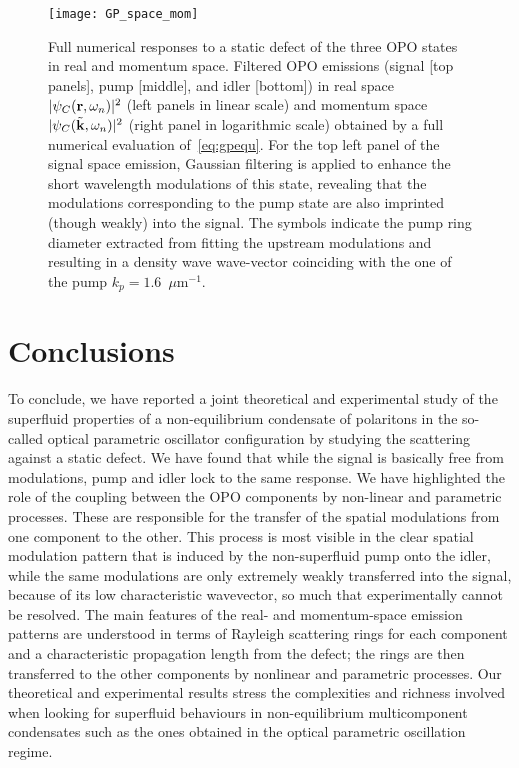 %
\begin{figure}[tb]
\centering
\texttt{[image: GP\_space\_mom]}
\caption{Full numerical responses to a static defect of
  the three OPO states in real and momentum space. Filtered OPO
  emissions (signal [top panels], pump [middle], and idler [bottom])
  in real space $|\psi_C (\mathbf{r},\omega_n)|^2$ (left panels in
  linear scale) and momentum space $|\psi_C
  (\tilde{\mathbf{k}},\omega_n)|^2$ (right panel in logarithmic scale)
  obtained by a full numerical evaluation of~\eqref{eq:gpequ}. For the
  top left panel of the signal space emission, Gaussian filtering is
  applied to enhance the short wavelength modulations of this state,
  revealing that the modulations corresponding to the pump state are
  also imprinted (though weakly) into the signal. The symbols indicate
  the pump ring diameter extracted from fitting the upstream
  modulations and resulting in a density wave wave-vector coinciding
  with the one of the pump $k_p=1.6$~$\mu$m$^{-1}$.}
\label{fig:numer}
\end{figure}
%
\section{Conclusions}
%
To conclude, we have reported a joint theoretical and experimental
study of the superfluid properties of a non-equilibrium condensate of
polaritons in the so-called optical parametric oscillator
configuration by studying the scattering against a static defect.
%
We have found that while the signal is basically free from
modulations, pump and idler lock to the same response. We have
highlighted the role of the coupling between the OPO components by
non-linear and parametric processes. These are responsible for the
transfer of the spatial modulations from one component to the
other. This process is most visible in the clear spatial modulation
pattern that is induced by the non-superfluid pump onto the idler,
while the same modulations are only extremely weakly transferred into
the signal, because of its low characteristic wavevector, so much that
experimentally cannot be resolved.
%
The main features of the real- and momentum-space emission patterns
are understood in terms of Rayleigh scattering rings for each
component and a characteristic propagation length from the defect; the
rings are then transferred to the other components by nonlinear and
parametric processes.
Our theoretical and experimental results stress the complexities and
richness involved when looking for superfluid behaviours in
non-equilibrium multicomponent condensates such as the ones obtained
in the optical parametric oscillation regime.


